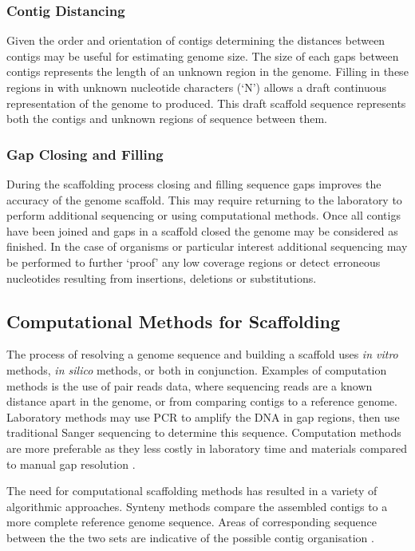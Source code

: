\documentclass[10pt]{bmc_article}
\newenvironment{bmcformat}{\begin{raggedright}\baselineskip20pt\sloppy\setboolean{publ}{false}}{\end{raggedright}\baselineskip20pt\sloppy}
\begin{document}
\begin{bmcformat}
\subsubsection*{Contig Distancing} %

Given the order and orientation of contigs determining the distances between
contigs may be useful for estimating genome size. The size of each gaps between
contigs represents the length of an unknown region in the genome. Filling in
these regions in with unknown nucleotide characters (`N') allows a draft
continuous representation of the genome to produced. This draft scaffold
sequence represents both the contigs and unknown regions of sequence between
them.

\subsubsection*{Gap Closing and Filling} %

During the scaffolding process closing and filling sequence gaps improves the
accuracy of the genome scaffold. This may require returning to the laboratory
to perform additional sequencing or using computational methods. Once all
contigs have been joined and gaps in a scaffold closed the genome may be
considered as finished. In the case of organisms or particular interest
additional sequencing may be performed to further `proof' any low coverage
regions or detect erroneous nucleotides resulting from insertions, deletions or
substitutions.

\subsection*{Computational Methods for Scaffolding} %

The process of resolving a genome sequence and building a scaffold uses
\emph{in vitro} methods, \emph{in silico} methods, or both in conjunction.
Examples of computation methods is the use of pair reads data, where sequencing
reads are a known distance apart in the genome, or from comparing contigs to
a reference genome. Laboratory methods may use PCR to amplify the DNA in gap
regions, then use traditional Sanger sequencing to determine this sequence.
Computation methods are more preferable as they less costly in laboratory time
and materials compared to manual gap resolution \cite{nagarajan2010}. \pb

The need for computational scaffolding methods has resulted in a variety of
algorithmic approaches. Synteny methods compare the assembled contigs to a more
complete reference genome sequence. Areas of corresponding sequence between the
the two sets are indicative of the possible contig organisation
\cite{richter2007,zhao2008}. \pb


\end{bmcformat}
\end{document}
